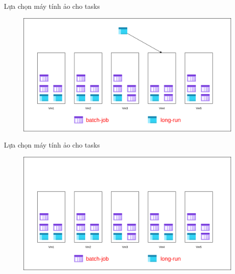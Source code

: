 \documentclass[11pt,xcolor={dvipsnames}, aspectratio=169]{beamer}
\begin{document}
\begin{frame}
{Lựa chọn máy tính ảo cho tasks}
	\begin{figure}
		\vspace{1cm}
		\includegraphics[scale=0.4]{images/balancing_tasks9.png}
	\end{figure}
\end{frame}

\begin{frame}
{Lựa chọn máy tính ảo cho tasks}
	\begin{figure}
		\vspace{1cm}
		\includegraphics[scale=0.4]{images/balancing_tasks10.png}
	\end{figure}
\end{frame}

\end{document}

